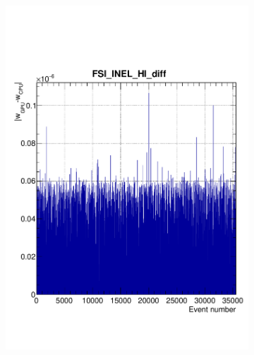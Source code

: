\begin{figure}[h]
	\begin{subfigure}[t]{0.45\textwidth}
		\includegraphics[width=\textwidth, trim={0mm 20mm 0mm 0mm}, clip, page=1]{figures/mach3/Asimov/fsi_inel_hi_diff}
	\end{subfigure}
	\begin{subfigure}[t]{0.45\textwidth}

\end{subfigure}
\end{figure}
